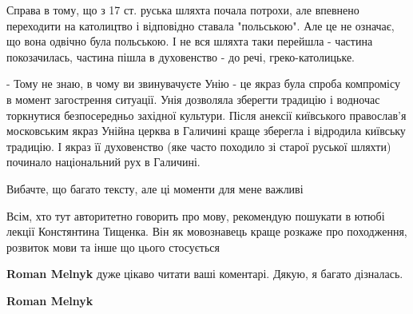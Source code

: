 \begin{itemize}
\begin{itemize}
Справа в тому, що з 17 ст. руська шляхта почала потрохи, але впевнено
переходити на католицтво і відповідно ставала "польською". Але це не означає,
що вона одвічно була польською. І не вся шляхта таки перейшла - частина
покозачилась, частина пішла в духовенство - до речі, греко-католицьке.

- Тому не знаю, в чому ви звинувачуєте Унію - це якраз була спроба компромісу в
момент загострення ситуації. Унія дозволяла зберегти традицію і водночас
торкнутися безпосередньо західної культури. Після анексії київського
православ'я московським якраз Унійна церква в Галичині краще зберегла і
відродила київську традицію. І якраз її духовенство (яке часто походило зі
старої руської шляхти) починало національний рух в Галичині.

Вибачте, що багато тексту, але ці моменти для мене важливі \Smiley[1.0][yellow]

 

Всім, хто тут авторитетно говорить про мову, рекомендую пошукати в ютюбі лекції
Констянтина Тищенка. Він як мовознавець краще розкаже про походження, розвиток
мови та інше що цього стосується


 
\textbf{Roman Melnyk} дуже цікаво читати ваші коментарі. Дякую, я багато дізналась. \Smiley[1.0][yellow]

 
\textbf{Roman Melnyk}


\end{itemize}

 

\end{itemize}
